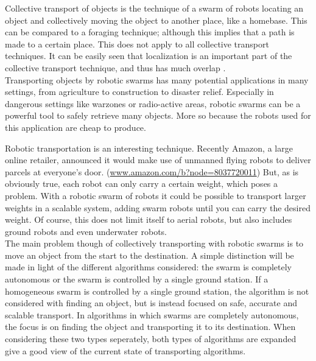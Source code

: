 
Collective transport of objects is the technique of a swarm of robots locating an object and collectively moving the object to another place, like a homebase. 
This can be compared to a foraging technique; although this implies that a path is made to a certain place. 
This does not apply to all collective transport techniques. \cite{hoff2010two}  
It can be easily seen that localization is an important part of the collective transport technique, and thus has much overlap .\\
Transporting objects by robotic swarms has many potential applications in many settings, from agriculture to construction to disaster relief. 
Especially in dangerous settings like warzones or radio-active areas, robotic swarms can be a powerful tool to safely retrieve many objects. 
More so because the robots used for this application are cheap to produce. 





Robotic transportation is an interesting technique. 
Recently Amazon, a large online retailer, announced it would make use of unmanned flying robots to deliver parcels at everyone's door. (\url{www.amazon.com/b?node=8037720011})
But, as is obviously true, each robot can only carry a certain weight, which poses a problem. 
With a robotic swarm of robots it could be possible to transport larger weights in a scalable system, adding swarm robots until you can carry the desired weight. 
Of course, this does not limit itself to aerial robots, but also includes ground robots and even underwater robots. \\
The main problem though of collectively transporting with robotic swarms is to move an object from the start to the destination.
A simple distinction will be made in light of the different algorithms considered: the swarm is completely autonomous or the swarm is controlled by a single ground station.
If a homogeneous swarm is controlled by a single ground station, the algorithm is not considered with finding an object, but is instead focused on safe, accurate and scalable transport. 
In algorithms in which swarms are completely autonomous, the focus is on finding the object and transporting it to its destination.
When considering these two types seperately, both types of algorithms are expanded give a good view of the current state of transporting algorithms.  \\

